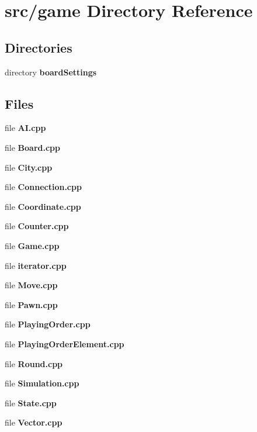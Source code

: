 \section{src/game Directory Reference}
\label{dir_1699be727a800b1d059c6f7f2b91d2ee}
\subsection*{Directories}
\begin{DoxyCompactItemize}
\item 
directory {\bf board\-Settings}
\end{DoxyCompactItemize}
\subsection*{Files}
\begin{DoxyCompactItemize}
\item 
file {\bfseries A\-I.\-cpp}
\item 
file {\bfseries Board.\-cpp}
\item 
file {\bfseries City.\-cpp}
\item 
file {\bfseries Connection.\-cpp}
\item 
file {\bfseries Coordinate.\-cpp}
\item 
file {\bfseries Counter.\-cpp}
\item 
file {\bfseries Game.\-cpp}
\item 
file {\bfseries iterator.\-cpp}
\item 
file {\bfseries Move.\-cpp}
\item 
file {\bfseries Pawn.\-cpp}
\item 
file {\bfseries Playing\-Order.\-cpp}
\item 
file {\bfseries Playing\-Order\-Element.\-cpp}
\item 
file {\bfseries Round.\-cpp}
\item 
file {\bfseries Simulation.\-cpp}
\item 
file {\bfseries State.\-cpp}
\item 
file {\bfseries Vector.\-cpp}
\end{DoxyCompactItemize}
